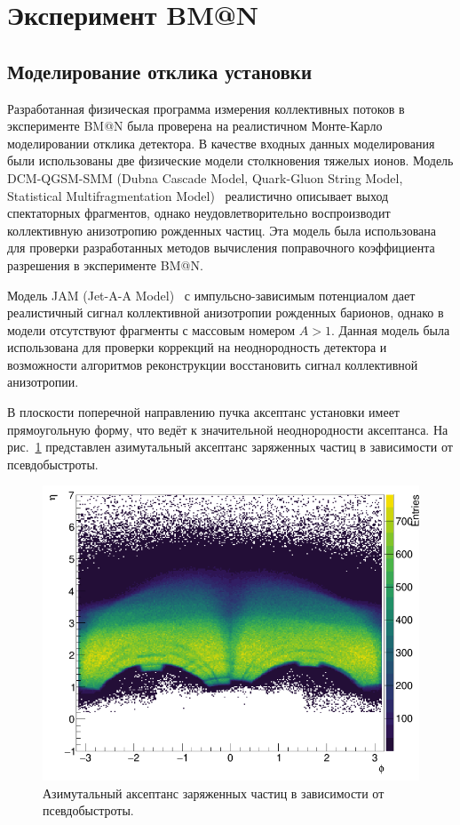 \section{Эксперимент BM@N}

\subsection{Моделирование отклика установки}

Разработанная физическая программа измерения коллективных потоков в эксперименте BM@N была проверена на реалистичном Монте-Карло моделировании отклика детектора. 
В качестве входных данных моделирования были использованы две физические модели столкновения тяжелых ионов.
Модель DCM-QGSM-SMM (Dubna Cascade Model, Quark-Gluon String Model, Statistical Multifragmentation Model)~\cite{Botvina:1994vj,Baznat:2019iom} реалистично описывает выход спектаторных фрагментов, однако неудовлетворительно воспроизводит коллективную анизотропию рожденных частиц.
Эта модель была использована для проверки разработанных методов вычисления поправочного коэффициента разрешения в эксперименте BM@N.

Модель JAM (Jet-A-A Model)~\cite{Nara:2016hbg,Nara:2019qfd,Nara:2020ztb} с импульсно-зависимым потенциалом дает реалистичный сигнал коллективной анизотропии рожденных барионов, однако в модели отсутствуют фрагменты с массовым номером $A>1$.
Данная модель была использована для проверки коррекций на неоднородность детектора и возможности алгоритмов реконструкции восстановить сигнал коллективной анизотропии.

В плоскости поперечной направлению пучка аксептанс установки имеет прямоугольную форму, что ведёт к значительной неоднородности аксептанса.
На рис.~\ref{fig:bmn_phi_eta} представлен азимутальный аксептанс заряженных частиц в зависимости от псевдобыстроты. 
%
\begin{figure}[ht]
\begin{center}
\includegraphics[width=0.55\linewidth]{images/bmn_phi_eta.png}
\caption{Азимутальный аксептанс заряженных частиц в зависимости от псевдобыстроты.}
\label{fig:bmn_phi_eta}
\end{center}
\end{figure}

